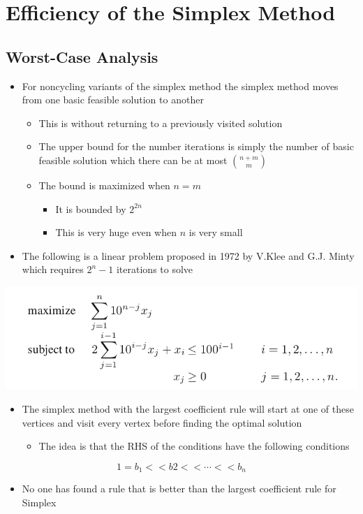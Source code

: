 \documentclass[11pt]{article}
\begin{document}
\section{Efficiency of the Simplex Method}
\label{sec:org24d1e6b}
\subsection{Worst-Case Analysis}
\label{sec:org07ec894}
\begin{itemize}
\item For noncycling variants of the simplex method the simplex method moves from one basic feasible solution to another
\begin{itemize}
\item This is without returning to a previously visited solution
\item The upper bound for the number iterations is simply the number of basic feasible solution which there can be at most \(\binom{n+m}{m}\)
\item The bound is maximized when \(n=m\)
\begin{itemize}
\item It is bounded by \(2^{2n}\)
\item This is very huge even when \(n\) is very small
\end{itemize}
\end{itemize}

\item The following is a linear problem proposed in 1972 by V.Klee and G.J. Minty which requires \(2^n-1\) iterations to solve
\end{itemize}
\begin{center}
\includegraphics[width=.9\linewidth]{Efficiency of the Simplex Method/screenshot_2019-02-06_10-28-46.png}
\end{center}
\begin{itemize}
\item The simplex method with the largest coefficient rule will start at one of these vertices and visit every vertex before finding the optimal solution
\begin{itemize}
\item The idea is that the RHS of the conditions have the following conditions
\end{itemize}
\end{itemize}
\begin{equation}
 1 = b_1 << b2 << \cdots << b_n 
\end{equation}
\begin{itemize}
\item No one has found a rule that is better than the largest coefficient rule for Simplex
\end{itemize}
\end{document}
